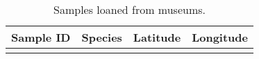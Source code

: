 
\begin{table}
\begin{center}
\caption{\label{tab:museumHyb} Samples loaned from museums.}
\begin{tabular}{llll}
\hline
Sample ID & Species & Latitude & Longitude \\
\hline
 
\\
\hline
\end{tabular}
\end{center}
\end{table}